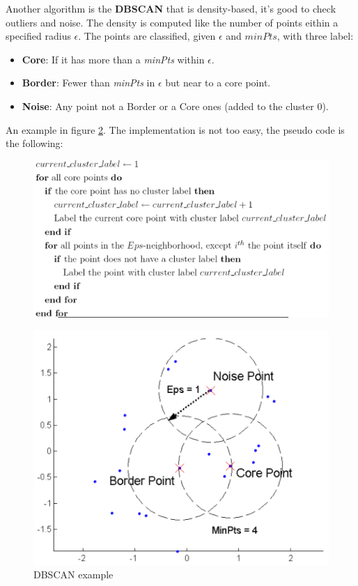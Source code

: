 \documentclass[12pt]{article}
\begin{document}
Another algorithm is the \textbf{DBSCAN} that is density-based, it's good to check outliers and noise. The density is computed like the number of points eithin a specified radius $\epsilon$. The points are classified, given $\epsilon$ and $minPts$, with three label:
\begin{itemize}
  \item \textbf{Core}: If it has more than a \textit{minPts} within $\epsilon$.
  \item \textbf{Border}: Fewer than \textit{minPts} in $\epsilon$ but near to a core point.
  \item \textbf{Noise}: Any point not a Border or a Core ones (added to the cluster 0).
\end{itemize}
An example in figure \ref{fig:dbscan}.
The implementation is not too easy, the pseudo code is the following:
\begin{figure}[H]
  \centering
  \includegraphics[width=0.8\linewidth]{images/dbscan_pseudo.png}
  \label{fig:dbscan_pseudo}
\end{figure}
\begin{figure}[h!]
  \centering
  \includegraphics[width=0.8\linewidth]{images/dbscan.png}
  \caption{DBSCAN example}
  \label{fig:dbscan}
\end{figure}
\end{document}
